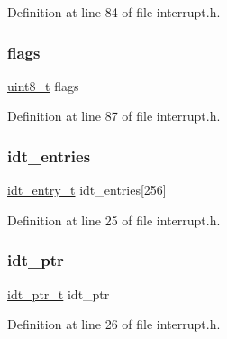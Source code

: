 Definition at line 84 of file interrupt.\+h.

\mbox{\label{a00110_aa2585d779da0ab21273a8d92de9a0ebe_aa2585d779da0ab21273a8d92de9a0ebe}} 
\subsubsection{\texorpdfstring{flags}{flags}}
{\footnotesize\ttfamily \hyperlink{a00140_aba7bc1797add20fe3efdf37ced1182c5_aba7bc1797add20fe3efdf37ced1182c5}{uint8\+\_\+t} flags}



Definition at line 87 of file interrupt.\+h.

\mbox{\label{a00110_a02c62ffc54da283f5faaa40b125d2dce_a02c62ffc54da283f5faaa40b125d2dce}} 
\subsubsection{\texorpdfstring{idt\+\_\+entries}{idt\_entries}}
{\footnotesize\ttfamily \hyperlink{a00110_a1ad45e5b006481ff3604f7b54bd26e13_a1ad45e5b006481ff3604f7b54bd26e13}{idt\+\_\+entry\+\_\+t} idt\+\_\+entries\mbox{[}256\mbox{]}}



Definition at line 25 of file interrupt.\+h.

\mbox{\label{a00110_a3f2660783240a0a506d85e3750dff814_a3f2660783240a0a506d85e3750dff814}} 
\subsubsection{\texorpdfstring{idt\+\_\+ptr}{idt\_ptr}}
{\footnotesize\ttfamily \hyperlink{a00110_a4c173f183e148c7a8a8c1ed9214b909e_a4c173f183e148c7a8a8c1ed9214b909e}{idt\+\_\+ptr\+\_\+t} idt\+\_\+ptr}



Definition at line 26 of file interrupt.\+h.

